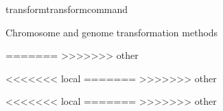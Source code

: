 \begin{command}{transform}{transformcommand}
\begin{arguments}
\begin{argumentgroup}{Chromosome and genome transformation methods}
{\begin{statement}
\begin{description}
\begin{description}
=======
>>>>>>> other

<<<<<<< local
=======
>>>>>>> other

<<<<<<< local
=======
>>>>>>> other


\end{description}
\end{description}
\end{statement}}
\end{argumentgroup}
\end{arguments}
\end{command}
